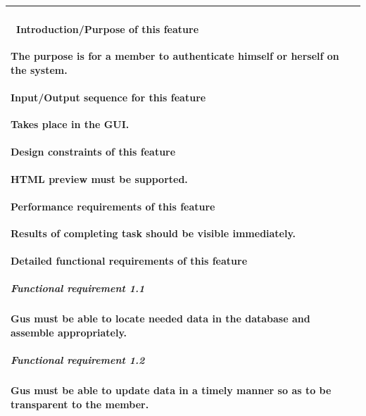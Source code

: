 \documentclass[letterpaper]{article}
\begin{document}
\begin{flushleft}
\begin{supertabular}{|m{3.17056in}|m{3.1712599in}|}
\paragraph[\ Introduction/Purpose of this
feature]{\rmfamily \ Introduction/Purpose of
this feature}
{\color{black} The purpose is for a member to authenticate himself or
herself on the system.}

\paragraph[Input/Output sequence for this
feature]{\rmfamily Input/Output sequence for
this feature}
{\color{black} Takes place in the GUI.}

\paragraph[Design constraints of this
feature]{\rmfamily Design constraints of this
feature}
{\color{black} HTML preview must be supported.}

\paragraph[Performance requirements of this
feature]{\rmfamily Performance requirements of
this feature}
{\color{black} Results of completing task should be visible
immediately.}

\paragraph[Detailed functional requirements of this
feature]{\rmfamily Detailed functional
requirements of this feature}
\subparagraph[Functional requirement 1.1]{
Functional requirement 1.1}
{\color{black} Gus must be able to locate needed data in the database
and assemble appropriately.}

\subparagraph[Functional requirement 1.2]{
Functional requirement 1.2}
{\color{black} Gus must be able to update data in a timely manner so as
to be transparent to the member.}

~
\\\hline
\end{supertabular}
\end{flushleft}

\bigskip
\end{document}
